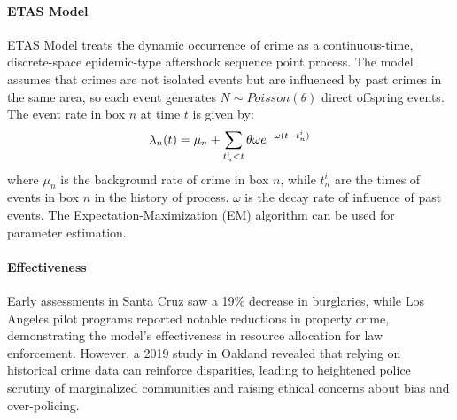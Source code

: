 \documentclass[11pt]{article}
\begin{document}
\paragraph{ETAS Model\cite{ETAS_ogata1988statistical}}
ETAS Model treats the dynamic occurrence of crime as a continuous-time, discrete-space epidemic-type aftershock sequence point process. The model assumes that crimes are not isolated events but are influenced by past crimes in the same area, so each event generates $N \sim Poisson(\theta)$ direct offspring events. The event rate in box $n$ at time $t$ is given by:
\vspace*{-0.5em}
\begin{equation}
    \lambda_n(t) = \mu_n + \sum_{t_n^i < t} \theta \omega e^{-\omega (t - t_n^i)}
    \vspace*{-0.8em}
\end{equation}
where $\mu_n$ is the background rate of crime in box $n$, while $t_n^i$ are the times of events in box $n$ in the history of process. $\omega$ is the decay rate of influence of past events. The Expectation-Maximization (EM) algorithm can be used for parameter estimation\cite{lum_etas_em}. 



\paragraph{Effectiveness} 
Early assessments in Santa Cruz saw a 19\% decrease in burglaries, while Los Angeles pilot programs reported notable reductions in property crime, demonstrating the model’s effectiveness in resource allocation for law enforcement. However, a 2019 study in Oakland revealed that relying on historical crime data can reinforce disparities, leading to heightened police scrutiny of marginalized communities and raising ethical concerns about bias and over-policing.
\end{document}
